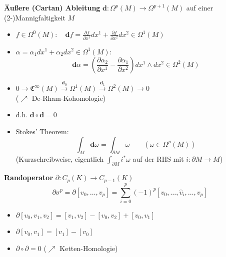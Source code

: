 \documentclass[handout]{beamer}
\renewcommand{\d}{\textbf{d}}
\newcommand{\ablx}[2]{\frac{\partial #1}{\partial x^{#2}}}
\begin{document}
  \begin{frame}
    \begin{block}{\textbf{Äußere (Cartan) Ableitung} \( \d: \Omega^{p}(M) \longrightarrow \Omega^{p+1}(M) \) auf einer (2-)Mannigfaltigkeit \( M \)}
      \begin{itemize}
        \item<2-> \( f \in \Omega^{0}(M):\quad \d f = \ablx{f}{1}dx^{1} + \ablx{f}{2}dx^{2} \in  \Omega^{1}(M)\)
        \item<3-> \( \alpha = \alpha_{1}dx^{1} + \alpha_{2}dx^{2} \in \Omega^{1}(M):\) 
                \[\d\alpha = \left( \ablx{\alpha_{2}}{1} - \ablx{\alpha_{1}}{2} \right) dx^{1} \wedge dx^{2} \in \Omega^{2}(M)\]
        \item<4-> \( 0 \rightarrow \mathfrak{C}^{\infty}(M) \overset{\d_{0}}{\rightarrow} \Omega^{1}(M) \overset{\d_{1}}{\rightarrow} \Omega^{2}(M) \rightarrow 0\) \\
              (\( \nearrow \) De-Rham-Kohomologie)
        \item<4-> d.h. \( \d\circ\d = 0 \)
        \item<5-> Stokes' Theorem: 
            \[ \int_{M}\d\omega = \int_{\partial M} \omega \qquad (\omega\in\Omega^{p}(M))\]
            (Kurzschreibweise, eigentlich \( \int_{\partial M} i^{*}\omega \) auf der RHS mit \( i: \partial M \rightarrow M \))
      \end{itemize}
    \end{block}
  \end{frame}

  \begin{frame}
    \begin{block}{\textbf{Randoperator} \( \partial:C_{p}(K) \longrightarrow C_{p-1}(K) \)}
      \[ \partial\sigma^{p} = \partial\left[ v_{0}, \ldots, v_{p} \right] = \sum_{i=0}^{p} (-1)^{p} \left[ v_{0}, \ldots, \hat{v}_{i}, \ldots,  v_{p} \right]\]
      \begin{itemize}
        \item \( \partial\left[ v_{0}, v_{1}, v_{2} \right] = \left[ v_{1}, v_{2} \right] - \left[ v_{0}, v_{2} \right] + \left[ v_{0}, v_{1} \right]\)
        \item \( \partial\left[ v_{0}, v_{1} \right] = \left[ v_{1} \right] - \left[ v_{0} \right]\)
        \item \( \partial\circ\partial = 0 \) \qquad(\( \nearrow \) Ketten-Homologie)
      \end{itemize}
    \end{block}
  \end{frame}
\end{document}
